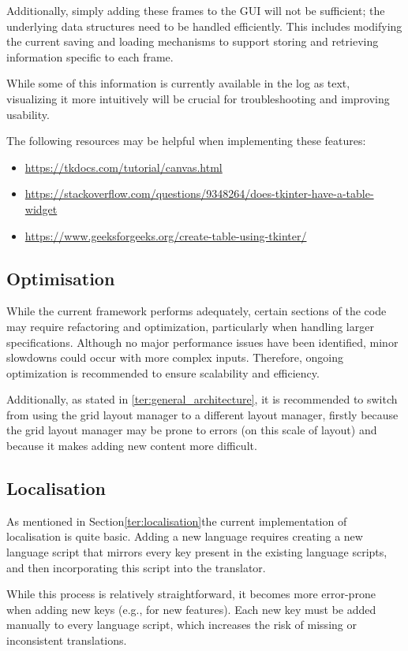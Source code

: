 \documentclass{article}
\begin{document}
Additionally, simply adding these frames to the GUI will not be sufficient; the underlying data structures need to be handled efficiently. This includes modifying the current saving and loading mechanisms to support storing and retrieving information specific to each frame.

While some of this information is currently available in the log as text, visualizing it more intuitively will be crucial for troubleshooting and improving usability.

The following resources may be helpful when implementing these features:
\begin{itemize}
    \item \url{https://tkdocs.com/tutorial/canvas.html}
    \item \url{https://stackoverflow.com/questions/9348264/does-tkinter-have-a-table-widget}
    \item \url{https://www.geeksforgeeks.org/create-table-using-tkinter/}
\end{itemize}

\subsection{Optimisation}
While the current framework performs adequately, certain sections of the code may require refactoring and optimization, particularly when handling larger specifications. Although no major performance issues have been identified, minor slowdowns could occur with more complex inputs. Therefore, ongoing optimization is recommended to ensure scalability and efficiency.

Additionally, as stated in \ref{ter:general_architecture}, it is recommended to switch from using the grid layout manager to a different layout manager, firstly because the grid layout manager may be prone to errors (on this scale of layout) and because it makes adding new content more difficult.

\subsection{Localisation}
\label{ter:roadmap_localisation}
As mentioned in Section\ref{ter:localisation}the current implementation of localisation is quite basic. Adding a new language requires creating a new language script that mirrors every key present in the existing language scripts, and then incorporating this script into the translator.

While this process is relatively straightforward, it becomes more error-prone when adding new keys (e.g., for new features). Each new key must be added manually to every language script, which increases the risk of missing or inconsistent translations.
\end{document}
